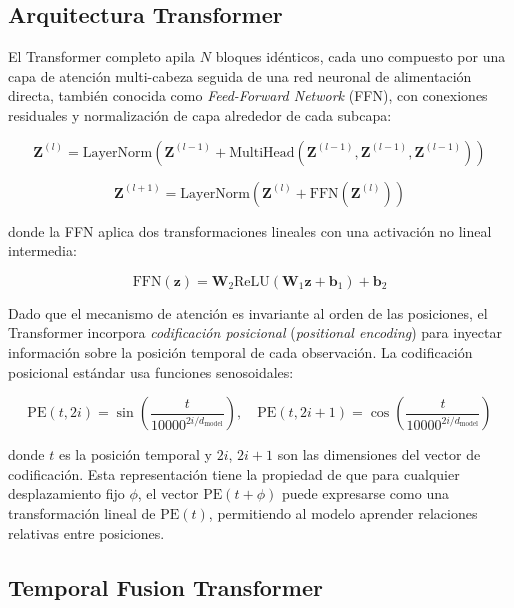 \subsection{Arquitectura Transformer}

El Transformer completo apila $N$ bloques idénticos, cada uno compuesto por una capa de atención multi-cabeza seguida de una red neuronal de alimentación directa, también conocida como \textit{Feed-Forward Network} (FFN), con conexiones residuales y normalización de capa alrededor de cada subcapa:

\begin{equation}
\mathbf{Z}^{(l)} = \text{LayerNorm}\left(\mathbf{Z}^{(l-1)} + \text{MultiHead}(\mathbf{Z}^{(l-1)}, \mathbf{Z}^{(l-1)}, \mathbf{Z}^{(l-1)})\right)
\end{equation}

\begin{equation}
\mathbf{Z}^{(l+1)} = \text{LayerNorm}\left(\mathbf{Z}^{(l)} + \text{FFN}(\mathbf{Z}^{(l)})\right)
\end{equation}

donde la FFN aplica dos transformaciones lineales con una activación no lineal intermedia:

\begin{equation}
\text{FFN}(\mathbf{z}) = \mathbf{W}_2 \text{ReLU}(\mathbf{W}_1 \mathbf{z} + \mathbf{b}_1) + \mathbf{b}_2
\end{equation}

Dado que el mecanismo de atención es invariante al orden de las posiciones, el Transformer incorpora \textit{codificación posicional} (\textit{positional encoding}) para inyectar información sobre la posición temporal de cada observación. La codificación posicional estándar usa funciones senosoidales:

\begin{equation}
\text{PE}(t, 2i) = \sin\left(\frac{t}{10000^{2i/d_{\text{model}}}}\right), \quad
\text{PE}(t, 2i+1) = \cos\left(\frac{t}{10000^{2i/d_{\text{model}}}}\right)
\end{equation}

donde $t$ es la posición temporal y $2i$, $2i+1$ son las dimensiones del vector de codificación. Esta representación tiene la propiedad de que para cualquier desplazamiento fijo $\phi$, el vector $\text{PE}(t+\phi)$ puede expresarse como una transformación lineal de $\text{PE}(t)$, permitiendo al modelo aprender relaciones relativas entre posiciones.

\subsection{Temporal Fusion Transformer}

